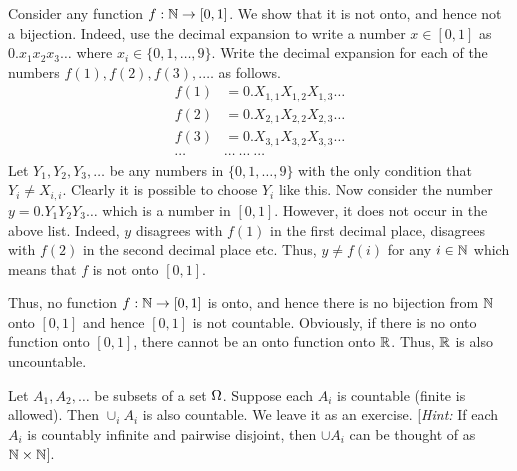\documentclass[preprint,  11pt]{amsart}
\begin{document}
Consider any function $f:\mathbb{N} \rightarrow [0,1]$. We show that it is not onto, and hence not a bijection. Indeed, use the decimal expansion to write a number $x\in [0,1]$ as $0.x_{1}x_{2}x_{3}\ldots$ where $x_{i}\in \{0,1,\ldots ,9\}$. Write the decimal expansion for each of the numbers $f(1),f(2),f(3),.\ldots$ as follows.
\begin{align*}
f(1)&=0.X_{1,1}X_{1,2}X_{1,3}\ldots \\
f(2)&=0.X_{2,1}X_{2,2}X_{2,3}\ldots \\
f(3)&=0.X_{3,1}X_{3,2}X_{3,3}\ldots \\
\cdots & \cdots \; \cdots \; \cdots
\end{align*}
Let $Y_{1},Y_{2},Y_{3},\ldots$ be any numbers in $\{0,1,\ldots ,9\}$ with the only condition that $Y_{i}\not= X_{i,i}$. Clearly it is possible to choose $Y_{i}$ like this. Now consider the number $y=0.Y_{1}Y_{2}Y_{3}\ldots$ which is a number in $[0,1]$. However, it does not occur in the above list. Indeed, $y$ disagrees with $f(1)$ in the first decimal place, disagrees with $f(2)$ in the second decimal place etc. Thus, $y\not= f(i)$ for any $i\in \mathbb{N}$ which means that $f$ is not onto $[0,1]$.

Thus, no function $f:\mathbb{N}\rightarrow [0,1]$ is onto, and hence there is no bijection from $\mathbb{N}$ onto $[0,1]$ and hence $[0,1]$ is not countable. Obviously, if there is no onto function onto $[0,1]$, there cannot be an onto function onto $\mathbb{R}$. Thus, $\mathbb{R}$ is also uncountable.
\eeg

\beg Let $A_{1},A_{2},\ldots $ be subsets of a set $\Omega$. Suppose each $A_{i}$ is countable (finite is allowed). Then $\cup_{i}A_{i}$ is also countable. We leave it as an exercise. [{\em Hint:} If each $A_{i}$ is countably infinite and pairwise disjoint, then $\cup A_{i}$ can be thought of as $\mathbb{N}\times \mathbb{N}$].
\eeg
\end{document}
